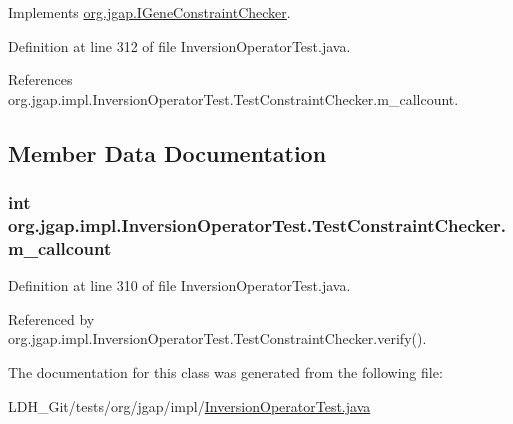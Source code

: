Implements \hyperlink{interfaceorg_1_1jgap_1_1_i_gene_constraint_checker_abf34442f71a7a860d42b3efc8554efb4}{org.\-jgap.\-I\-Gene\-Constraint\-Checker}.



Definition at line 312 of file Inversion\-Operator\-Test.\-java.



References org.\-jgap.\-impl.\-Inversion\-Operator\-Test.\-Test\-Constraint\-Checker.\-m\-\_\-callcount.



\subsection{Member Data Documentation}
\hypertarget{classorg_1_1jgap_1_1impl_1_1_inversion_operator_test_1_1_test_constraint_checker_a01841f6cbcaf8d58b6a02c94d5ec9c15}{
\subsubsection[{m\-\_\-callcount}]{\setlength{\rightskip}{0pt plus 5cm}int org.\-jgap.\-impl.\-Inversion\-Operator\-Test.\-Test\-Constraint\-Checker.\-m\-\_\-callcount\hspace{0.3cm}{\ttfamily [private]}}}\label{classorg_1_1jgap_1_1impl_1_1_inversion_operator_test_1_1_test_constraint_checker_a01841f6cbcaf8d58b6a02c94d5ec9c15}


Definition at line 310 of file Inversion\-Operator\-Test.\-java.



Referenced by org.\-jgap.\-impl.\-Inversion\-Operator\-Test.\-Test\-Constraint\-Checker.\-verify().



The documentation for this class was generated from the following file\-:\begin{DoxyCompactItemize}
\item 
L\-D\-H\-\_\-\-Git/tests/org/jgap/impl/\hyperlink{_inversion_operator_test_8java}{Inversion\-Operator\-Test.\-java}\end{DoxyCompactItemize}
